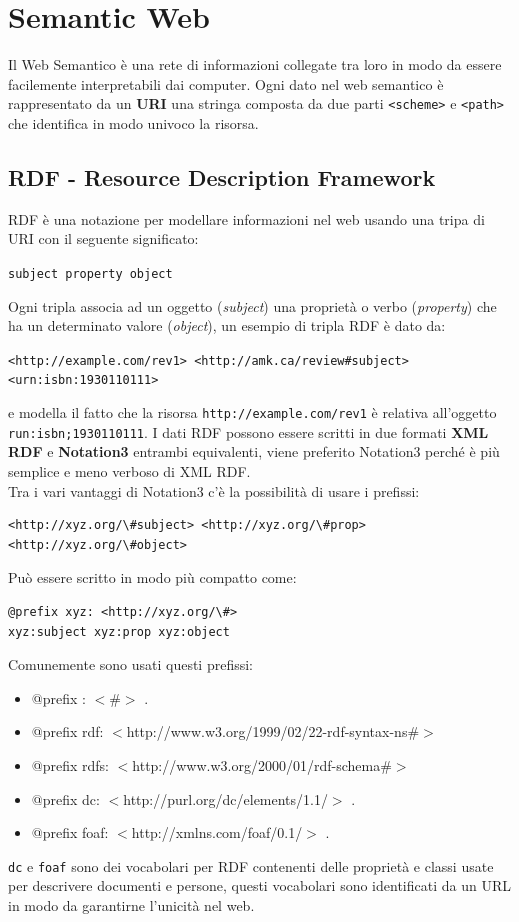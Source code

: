 \section{Semantic Web}
Il Web Semantico è una rete di informazioni collegate tra loro in modo da essere facilemente interpretabili dai computer.
Ogni dato nel web semantico è rappresentato da un \textbf{URI} una stringa composta da due parti \texttt{<scheme>} e \texttt{<path>} che identifica in modo univoco la risorsa.

\subsection{RDF - Resource Description Framework}
RDF è una notazione per modellare informazioni nel web usando una tripa di URI con il seguente significato:
\begin{center}
\texttt{subject property object}
\end{center}
Ogni tripla associa ad un oggetto (\textit{subject}) una proprietà o verbo (\textit{property}) che ha un determinato valore (\textit{object}), un esempio di tripla RDF è dato da:
\begin{center}
\texttt{<http://example.com/rev1> <http://amk.ca/review\#subject> <urn:isbn:1930110111>}
\end{center}
e modella il fatto che la risorsa \texttt{http://example.com/rev1} è relativa all'oggetto \texttt{run:isbn;1930110111}.
I dati RDF possono essere scritti in due formati \textbf{XML RDF} e \textbf{Notation3} entrambi equivalenti, viene preferito Notation3 perché è più semplice e meno verboso di XML RDF.\\ 
Tra i vari vantaggi di Notation3 c'è la possibilità di usare i prefissi:
\begin{lstlisting}
<http://xyz.org/\#subject> <http://xyz.org/\#prop> <http://xyz.org/\#object>
\end{lstlisting}
Può essere scritto in modo più compatto come:
\begin{lstlisting}
@prefix xyz: <http://xyz.org/\#>
xyz:subject xyz:prop xyz:object
\end{lstlisting}
Comunemente sono usati questi prefissi:
\begin{itemize}
\item @prefix : $<$\#$>$ .
\item @prefix rdf: $<$http://www.w3.org/1999/02/22-rdf-syntax-ns\#$>$
\item @prefix rdfs: $<$http://www.w3.org/2000/01/rdf-schema\#$>$ 
\item @prefix dc: $<$http://purl.org/dc/elements/1.1/$>$ .
\item @prefix foaf: $<$http://xmlns.com/foaf/0.1/$>$ .
\end{itemize}
\texttt{dc} e \texttt{foaf} sono dei vocabolari per RDF contenenti delle proprietà e classi usate per descrivere documenti e persone, questi vocabolari sono identificati da un URL in modo da garantirne l'unicità nel web.

